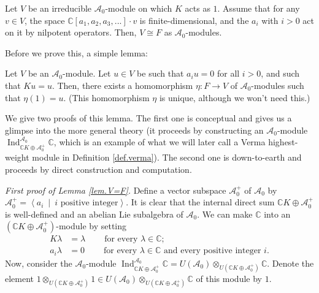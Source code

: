 \documentclass[etingof-lie.tex]{subfiles}
\begin{document}
\begin{proposition}
\label{prop.V=F}Let $V$ be an irreducible $\mathcal{A}_{0}$-module on which
$K$ acts as $1$. Assume that for any $v\in V$, the space $\mathbb{C}\left[
a_{1},a_{2},a_{3},...\right]  \cdot v$ is finite-dimensional, and the $a_{i}$
with $i>0$ act on it by nilpotent operators. Then, $V\cong F$ as
$\mathcal{A}_{0}$-modules.
\end{proposition}

Before we prove this, a simple lemma:

\begin{lemma}
\label{lem.V=F}Let $V$ be an $\mathcal{A}_{0}$-module. Let $u\in V$ be such
that $a_{i}u=0$ for all $i>0$, and such that $Ku=u$. Then, there exists a
homomorphism $\eta:F\rightarrow V$ of $\mathcal{A}_{0}$-modules such that
$\eta\left(  1\right)  =u$. (This homomorphism $\eta$ is unique, although we
won't need this.)
\end{lemma}

We give two proofs of this lemma. The first one is conceptual and gives us a
glimpse into the more general theory (it proceeds by constructing an
$\mathcal{A}_{0}$-module $\operatorname*{Ind}\nolimits_{\mathbb{C}%
K\oplus\mathcal{A}_{0}^{+}}^{\mathcal{A}_{0}}\mathbb{C}$, which is an example
of what we will later call a Verma highest-weight module in Definition
\ref{def.verma}). The second one is down-to-earth and proceeds by direct
construction and computation.

\textit{First proof of Lemma \ref{lem.V=F}.} Define a vector subspace
$\mathcal{A}_{0}^{+}$ of $\mathcal{A}_{0}$ by $\mathcal{A}_{0}^{+}%
=\left\langle a_{i}\ \mid\ i\text{ positive integer}\right\rangle $. It is
clear that the internal direct sum $\mathbb{C}K\oplus\mathcal{A}_{0}^{+}$ is
well-defined and an abelian Lie subalgebra of $\mathcal{A}_{0}$. We can make
$\mathbb{C}$ into an $\left(  \mathbb{C}K\oplus\mathcal{A}_{0}^{+}\right)
$-module by setting%
\begin{align*}
K\lambda &  =\lambda\ \ \ \ \ \ \ \ \ \ \text{for every }\lambda\in
\mathbb{C};\\
a_{i}\lambda &  =0\ \ \ \ \ \ \ \ \ \ \text{for every }\lambda\in
\mathbb{C}\text{ and every positive integer }i.
\end{align*}
Now, consider the $\mathcal{A}_{0}$-module $\operatorname*{Ind}%
\nolimits_{\mathbb{C}K\oplus\mathcal{A}_{0}^{+}}^{\mathcal{A}_{0}}%
\mathbb{C}=U\left(  \mathcal{A}_{0}\right)  \otimes_{U\left(  \mathbb{C}%
K\oplus\mathcal{A}_{0}^{+}\right)  }\mathbb{C}$. Denote the element
$1\otimes_{U\left(  \mathbb{C}K\oplus\mathcal{A}_{0}^{+}\right)  }1\in
U\left(  \mathcal{A}_{0}\right)  \otimes_{U\left(  \mathbb{C}K\oplus
\mathcal{A}_{0}^{+}\right)  }\mathbb{C}$ of this module by $1$.
\end{document}
